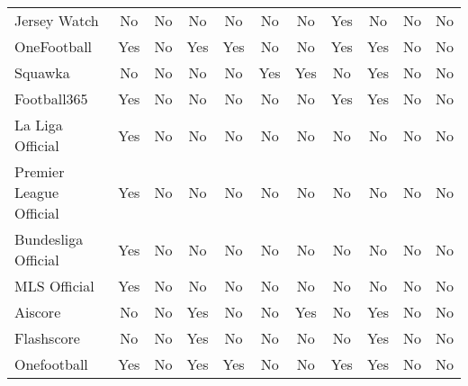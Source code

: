 \begin{table}[h!]
\begin{tabularx}{\textwidth}{|l|c|c|c|c|c|c|c|c|c|c|}
Jersey Watch & No & No & No & No & No & No & Yes & No & No & No \\
OneFootball & Yes & No & Yes & Yes & No & No & Yes & Yes & No & No \\
Squawka & No & No & No & No & Yes & Yes & No & Yes & No & No \\
Football365 & Yes & No & No & No & No & No & Yes & Yes & No & No \\
La Liga Official & Yes & No & No & No & No & No & No & No & No & No \\
Premier League Official & Yes & No & No & No & No & No & No & No & No & No \\
Bundesliga Official & Yes & No & No & No & No & No & No & No & No & No \\
MLS Official & Yes & No & No & No & No & No & No & No & No & No \\
Aiscore & No & No & Yes & No & No & Yes & No & Yes & No & No \\
Flashscore & No & No & Yes & No & No & No & No & Yes & No & No \\
Onefootball & Yes & No & Yes & Yes & No & No & Yes & Yes & No & No \\
\hline
\end{tabularx}
\end{table}



